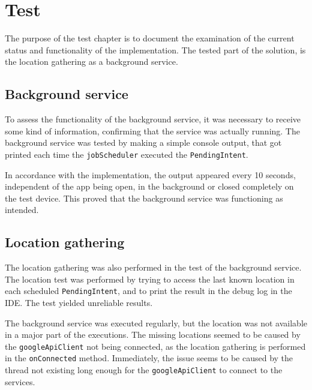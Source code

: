 \section{Test}
The purpose of the test chapter is to document the examination of the current status and functionality of the implementation.
The tested part of the solution, is the location gathering as a background service.


\subsection{Background service}
To assess the functionality of the background service, it was necessary to receive some kind of information, confirming that the service was actually running.
The background service was tested by making a simple console output, that got printed each time the \texttt{jobScheduler} executed the \texttt{PendingIntent}.

In accordance with the implementation, the output appeared every 10 seconds, independent of the app being open, in the background or closed completely on the test device.
This proved that the background service was functioning as intended.

\subsection{Location gathering}
The location gathering was also performed in the test of the background service.
The location test was performed by trying to access the last known location in each scheduled \texttt{PendingIntent}, and to print the result in the debug log in the IDE.
The test yielded unreliable results. 

The background service was executed regularly, but the location was not available in a major part of the executions.
The missing locations seemed to be caused by the \texttt{googleApiClient} not being connected, as the location gathering is performed in the \texttt{onConnected} method.
Immediately, the issue seems to be caused by the thread not existing long enough for the \texttt{googleApiClient} to connect to the services.



